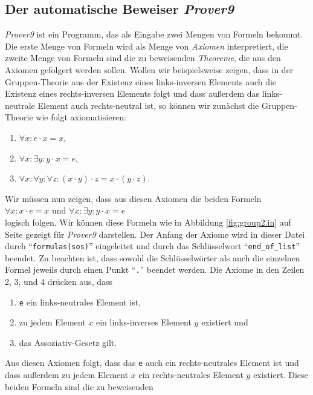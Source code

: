 \subsection{Der automatische Beweiser \textsl{Prover9}}
\textsl{Prover9} ist ein Programm, das als Eingabe zwei Mengen von Formeln bekommt.  Die erste Menge von
Formeln wird als Menge von \emph{Axiomen} interpretiert, die zweite Menge von Formeln sind die zu
beweisenden \emph{Theoreme}, die aus den Axiomen gefolgert werden sollen.  Wollen wir beispielsweise zeigen,
dass in der Gruppen-Theorie aus der Existenz eines  links-inversen Elements auch die Existenz eines
rechts-inversen Elements folgt und dass außerdem das links-neutrale Element auch rechts-neutral ist,
so können wir zunächst die Gruppen-Theorie wie folgt axiomatisieren:
\begin{enumerate}
\item $\forall x: e \cdot x = x$,
\item $\forall x: \exists y: y \cdot x = e$,
\item $\forall x: \forall y: \forall z: (x \cdot y) \cdot z = x \cdot (y \cdot z)$.
\end{enumerate}
Wir müssen nun zeigen, dass aus diesen Axiomen die beiden Formeln
\\[0.2cm]
\hspace*{1.3cm}
$\forall x: x \cdot e = x$ \quad und \quad $\forall x: \exists y: y \cdot x = e$ 
\\[0.2cm]
logisch folgen.  Wir können diese Formeln wie in Abbildung \ref{fig:group2.in} auf Seite
\pageref{fig:group2.in} gezeigt für \textsl{Prover9} darstellen.
Der Anfang der Axiome wird in dieser Datei durch ``\texttt{formulas(sos)}'' eingeleitet und durch
das Schlüsselwort ``\texttt{end\_of\_list}'' beendet.  Zu beachten ist, dass sowohl die Schlüsselwörter als
auch die einzelnen Formel jeweils durch einen Punkt ``\texttt{.}'' beendet werden.  Die Axiome in den Zeilen
2, 3, und 4 drücken aus, dass 
\begin{enumerate}
\item \texttt{e} ein links-neutrales Element ist,
\item zu jedem Element $x$ ein links-inverses Element $y$ existiert und
\item das Assoziativ-Gesetz gilt.
\end{enumerate}
Aus diesen Axiomen folgt, dass das \texttt{e} auch ein rechts-neutrales Element ist und dass außerdem zu
jedem Element $x$ ein rechts-neutrales Element $y$ existiert.  Diese beiden  Formeln sind die zu beweisenden 
